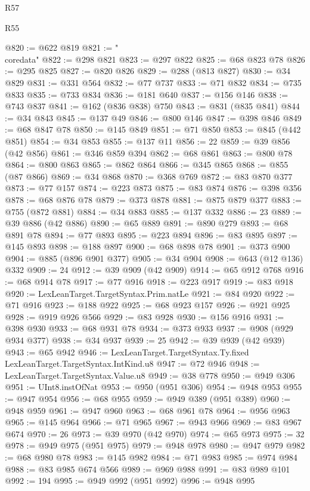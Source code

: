 \begin{lexlean}{R57}
\begin{lexlean}{R55}
\begin{coremodule}
{{{{{{{{{{{{{{{{{{{{{{{{{{{{{{{{{{{{{{{{{{{{{{{{{{{{{{{{{{{{{{@820 := @622 @819
@821 := "\\coredata"
@822 := @298 @821
@823 := @297 @822
@825 := @68 @823 @78
@826 := @295 @825
@827 := @820 @826
@829 := @288 (@813 @827)
@830 := @34 @829
@831 := @331 @564
@832 := @77 @737
@833 := @71 @832
@834 := @735 @833
@835 := @733 @834
@836 := @181 @640
@837 := @156 @146
@838 := @743 @837
@841 := @162 (@836 @838) @750
@843 := @831 (@835 @841)
@844 := @34 @843
@845 := @137 @49
@846 := @800 @146
@847 := @398 @846
@849 := @68 @847 @78
@850 := @145 @849
@851 := @71 @850
@853 := @845 (@442 @851)
@854 := @34 @853
@855 := @137 @11
@856 := 22
@859 := @39 @856 (@42 @856)
@861 := @346 @859 @394
@862 := @68 @861
@863 := @800 @78
@864 := @800 @863
@865 := @862 @864
@866 := @345 @865
@868 := @855 (@87 @866)
@869 := @34 @868
@870 := @368 @769
@872 := @83 @870 @377
@873 := @77 @157
@874 := @223 @873
@875 := @83 @874
@876 := @398 @356
@878 := @68 @876 @78
@879 := @373 @878
@881 := @875 @879 @377
@883 := @755 (@872 @881)
@884 := @34 @883
@885 := @137 @332
@886 := 23
@889 := @39 @886 (@42 @886)
@890 := @65 @889
@891 := @890 @279
@893 := @68 @891 @78
@894 := @77 @893
@895 := @223 @894
@896 := @83 @895
@897 := @145 @893
@898 := @188 @897
@900 := @68 @898 @78
@901 := @373 @900
@904 := @885 (@896 @901 @377)
@905 := @34 @904
@908 := @643 (@12 @136) @332
@909 := 24
@912 := @39 @909 (@42 @909)
@914 := @65 @912 @768
@916 := @68 @914 @78
@917 := @77 @916
@918 := @223 @917
@919 := @83 @918
@920 := LexLeanTarget.TargetSyntax.Prim.natLe
@921 := @84 @920
@922 := @71 @916
@923 := @188 @922
@925 := @68 @923 @157
@926 := @921 @925
@928 := @919 @926 @566
@929 := @83 @928
@930 := @156 @916
@931 := @398 @930
@933 := @68 @931 @78
@934 := @373 @933
@937 := @908 (@929 @934 @377)
@938 := @34 @937
@939 := 25
@942 := @39 @939 (@42 @939)
@943 := @65 @942
@946 := LexLeanTarget.TargetSyntax.Ty.fixed LexLeanTarget.TargetSyntax.IntKind.u8
@947 := @72 @946
@948 := LexLeanTarget.TargetSyntax.Value.u8
@949 := @38 @778
@950 := @949 @306
@951 := UInt8.instOfNat
@953 := @950 (@951 @306)
@954 := @948 @953
@955 := @947 @954
@956 := @68 @955
@959 := @949 @389 (@951 @389)
@960 := @948 @959
@961 := @947 @960
@963 := @68 @961 @78
@964 := @956 @963
@965 := @145 @964
@966 := @71 @965
@967 := @943 @966
@969 := @83 @967 @674
@970 := 26
@973 := @39 @970 (@42 @970)
@974 := @65 @973
@975 := 32
@978 := @949 @975 (@951 @975)
@979 := @948 @978
@980 := @947 @979
@982 := @68 @980 @78
@983 := @145 @982
@984 := @71 @983
@985 := @974 @984
@988 := @83 @985 @674 @566
@989 := @969 @988
@991 := @83 @989 @101
@992 := 194
@995 := @949 @992 (@951 @992)
@996 := @948 @995
}}}}}}}}}}}}}}}}}}}}}}}}}}}}}}}}}}}}}}}}}}}}}}}}}}}}}}}}}}}}}}
\end{coremodule}
\end{lexlean}
\end{lexlean}
